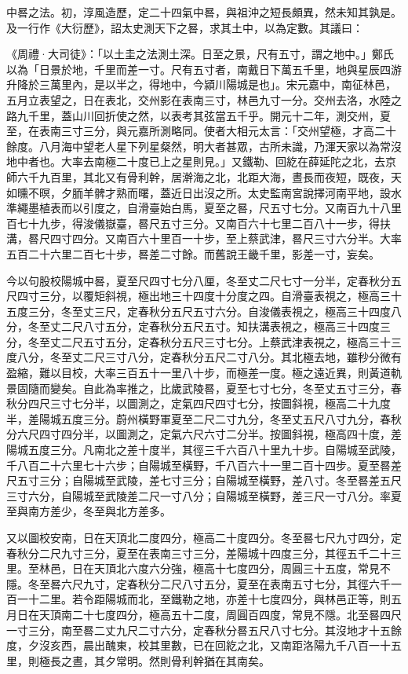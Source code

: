 \begin{pinyinscope}
 中晷之法。初，淳風造歷，定二十四氣中晷，與祖沖之短長頗異，然未知其孰是。及一行作《大衍歷》，詔太史測天下之晷，求其土中，以為定數。其議曰：



 《周禮·大司徒》：「以土圭之法測土深。日至之景，尺有五寸，謂之地中。」鄭氏以為「日景於地，千里而差一寸。尺有五寸者，南戴日下萬五千里，地與星辰四游升降於三萬里內，是以半之，得地中，今潁川陽城是也」。宋元嘉中，南征林邑，五月立表望之，日在表北，交州影在表南三寸，林邑九寸一分。交州去洛，水陸之路九千里，蓋山川回折使之然，以表考其弦當五千乎。開元十二年，測交州，夏至，在表南三寸三分，與元嘉所測略同。使者大相元太言：「交州望極，才高二十餘度。八月海中望老人星下列星粲然，明大者甚眾，古所未識，乃渾天家以為常沒地中者也。大率去南極二十度已上之星則見。」又鐵勒、回紇在薛延陀之北，去京師六千九百里，其北又有骨利幹，居澣海之北，北距大海，晝長而夜短，既夜，天如曛不暝，夕胹羊髀才熟而曙，蓋近日出沒之所。太史監南宮說擇河南平地，設水準繩墨植表而以引度之，自滑臺始白馬，夏至之晷，尺五寸七分。又南百九十八里百七十九步，得浚儀嶽臺，晷尺五寸三分。又南百六十七里二百八十一步，得扶溝，晷尺四寸四分。又南百六十里百一十步，至上蔡武津，晷尺三寸六分半。大率五百二十六里二百七十步，晷差二寸餘。而舊說王畿千里，影差一寸，妄矣。



 今以句股校陽城中晷，夏至尺四寸七分八厘，冬至丈二尺七寸一分半，定春秋分五尺四寸三分，以覆矩斜視，極出地三十四度十分度之四。自滑臺表視之，極高三十五度三分，冬至丈三尺，定春秋分五尺五寸六分。自浚儀表視之，極高三十四度八分，冬至丈二尺八寸五分，定春秋分五尺五寸。知扶溝表視之，極高三十四度三分，冬至丈二尺五寸五分，定春秋分五尺三寸七分。上蔡武津表視之，極高三十三度八分，冬至丈二尺三寸八分，定春秋分五尺二寸八分。其北極去地，雖秒分微有盈縮，難以目校，大率三百五十一里八十步，而極差一度。極之遠近異，則黃道軌景固隨而變矣。自此為率推之，比歲武陵晷，夏至七寸七分，冬至丈五寸三分，春秋分四尺三寸七分半，以圖測之，定氣四尺四寸七分，按圖斜視，極高二十九度半，差陽城五度三分。蔚州橫野軍夏至二尺二寸九分，冬至丈五尺八寸九分，春秋分六尺四寸四分半，以圖測之，定氣六尺六寸二分半。按圖斜視，極高四十度，差陽城五度三分。凡南北之差十度半，其徑三千六百八十里九十步。自陽城至武陵，千八百二十六里七十六步；自陽城至橫野，千八百六十一里二百十四步。夏至晷差尺五寸三分；自陽城至武陵，差七寸三分；自陽城至橫野，差八寸。冬至晷差五尺三寸六分，自陽城至武陵差二尺一寸八分；自陽城至橫野，差三尺一寸八分。率夏至與南方差少，冬至與北方差多。



 又以圖校安南，日在天頂北二度四分，極高二十度四分。冬至晷七尺九寸四分，定春秋分二尺九寸三分，夏至在表南三寸三分，差陽城十四度三分，其徑五千二十三里。至林邑，日在天頂北六度六分強，極高十七度四分，周圓三十五度，常見不隱。冬至晷六尺九寸，定春秋分二尺八寸五分，夏至在表南五寸七分，其徑六千一百一十二里。若令距陽城而北，至鐵勒之地，亦差十七度四分，與林邑正等，則五月日在天頂南二十七度四分，極高五十二度，周圓百四度，常見不隱。北至晷四尺一寸三分，南至晷二丈九尺二寸六分，定春秋分晷五尺八寸七分。其沒地才十五餘度，夕沒亥西，晨出醜東，校其里數，已在回紇之北，又南距洛陽九千八百一十五里，則極長之晝，其夕常明。然則骨利幹猶在其南矣。




\end{pinyinscope}
